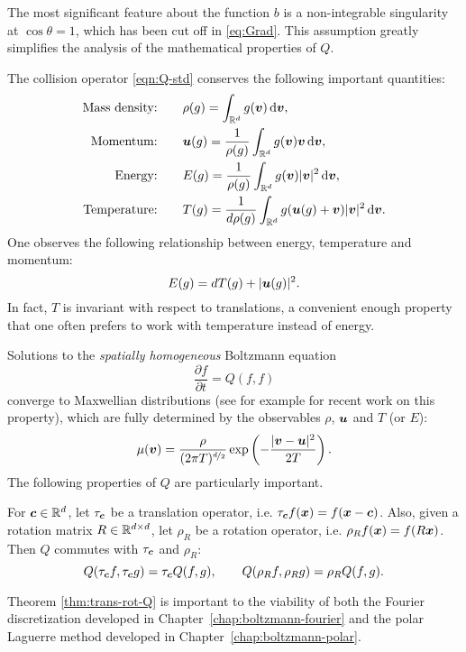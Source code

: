 The most significant feature about the function $b$ is a non-integrable singularity at $\cos\theta=1$, which
has been cut off in \eqref{eq:Grad}. This assumption greatly simplifies the analysis of the mathematical
properties of $Q$.

The collision operator \eqref{eqn:Q-std} conserves the following important quantities:
\begin{align*}
    \text{Mass density:} &\qquad\rho(g) = \int_{\mathbb{R}^d} g({\bm v})\,\mathrm{d}{\bm v},\\
    \text{Momentum:} &\qquad {\bm u}(g) = \frac{1}{\rho(g)}\int_{\mathbb{R}^d} g({\bm v}){\bm v}\,\mathrm{d}{\bm v},\\
    \text{Energy:} &\qquad E(g) = \frac{1}{\rho(g)}\int_{\mathbb{R}^d} g({\bm v})|{\bm v}|^2\,\mathrm{d}{\bm v},\\
    \text{Temperature:} &\qquad T(g) = \frac{1}{d\rho(g)}\int_{\mathbb{R}^d} g({\bm u}(g)+{\bm v})|{\bm v}|^2\,\mathrm{d}{\bm v}.
\end{align*}
One observes the following relationship between energy, temperature and momentum:
\[
    E(g) = dT(g) + |{\bm u}(g)|^2.
\]
In fact, $T$ is invariant with respect to translations, a convenient enough property that one often prefers to
work with temperature instead of energy.

Solutions to the {\em spatially homogeneous} Boltzmann equation 
\[
    \frac{\partial f}{\partial t} = Q(f,f)
\]
converge to Maxwellian distributions (see for example
\cite{Gressman2011gcs} for recent work on this property), which are
fully determined by the observables $\rho$, ${\bm u}$ and $T$ (or $E$):
\begin{equation} \label{eqn:maxwellian}
    \mu({\bm v}) = \frac{\rho}{(2\pi T)^{\nicefrac{d}{2}}} \exp\left( -\frac{|{\bm v}-{\bm u}|^2}{2T} \right).
\end{equation}
The following properties of $Q$ are particularly important.
\begin{theorem} \label{thm:trans-rot-Q}
For ${\bm c}\in\mathbb{R}^d$, let $\tau_{\bm c}$ be a translation operator, i.e. $\tau_{\bm c} f({\bm x}) = f({\bm x}-{\bm c})$. Also, given a
rotation matrix $R\in\mathbb{R}^{d\times d}$, let $\rho_R$ be a rotation operator, i.e. $\rho_R f({\bm x}) = f(R{\bm x})$.
Then $Q$ commutes with $\tau_{\bm c}$ and $\rho_R$:
\[
    Q(\tau_{\bm c} f, \tau_{\bm c} g) = \tau_{\bm c} Q(f,g), \qquad
    Q(\rho_R f, \rho_R g) = \rho_R Q(f,g).
\]
\end{theorem}
Theorem \ref{thm:trans-rot-Q} is important to the viability of both the Fourier discretization developed in
Chapter~\ref{chap:boltzmann-fourier} and the polar Laguerre method developed in
Chapter~\ref{chap:boltzmann-polar}.

